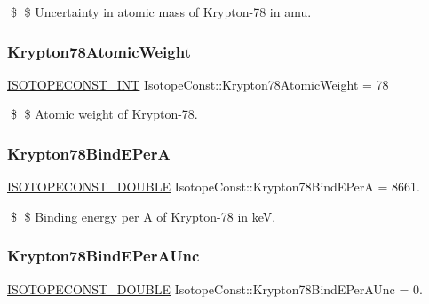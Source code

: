 \$ \$ Uncertainty in atomic mass of Krypton-\/78 in amu. \mbox{\label{group___isotope_const-_krypton-_kr78_ga4881960e5bccb14870ba0108bfbe83ea}} 
\subsubsection{\texorpdfstring{Krypton78\+Atomic\+Weight}{Krypton78AtomicWeight}}
{\footnotesize\ttfamily \mbox{\hyperlink{group___isotope_const-_macros_ga5f18360b3e99483a35c32d789e62621c}{I\+S\+O\+T\+O\+P\+E\+C\+O\+N\+S\+T\+\_\+\+I\+NT}} Isotope\+Const\+::\+Krypton78\+Atomic\+Weight = 78}

\$ \$ Atomic weight of Krypton-\/78. \mbox{\label{group___isotope_const-_krypton-_kr78_ga6bda6a9d76d53fd544d089b079a7db01}} 
\subsubsection{\texorpdfstring{Krypton78\+Bind\+E\+PerA}{Krypton78BindEPerA}}
{\footnotesize\ttfamily \mbox{\hyperlink{group___isotope_const-_macros_ga8f45a7272ce02c0b4c65c44636ed719a}{I\+S\+O\+T\+O\+P\+E\+C\+O\+N\+S\+T\+\_\+\+D\+O\+U\+B\+LE}} Isotope\+Const\+::\+Krypton78\+Bind\+E\+PerA = 8661.}

\$ \$ Binding energy per A of Krypton-\/78 in keV. \mbox{\label{group___isotope_const-_krypton-_kr78_ga77c75f8d811edb30d5129c1f2039f1a7}} 
\subsubsection{\texorpdfstring{Krypton78\+Bind\+E\+Per\+A\+Unc}{Krypton78BindEPerAUnc}}
{\footnotesize\ttfamily \mbox{\hyperlink{group___isotope_const-_macros_ga8f45a7272ce02c0b4c65c44636ed719a}{I\+S\+O\+T\+O\+P\+E\+C\+O\+N\+S\+T\+\_\+\+D\+O\+U\+B\+LE}} Isotope\+Const\+::\+Krypton78\+Bind\+E\+Per\+A\+Unc = 0.}

